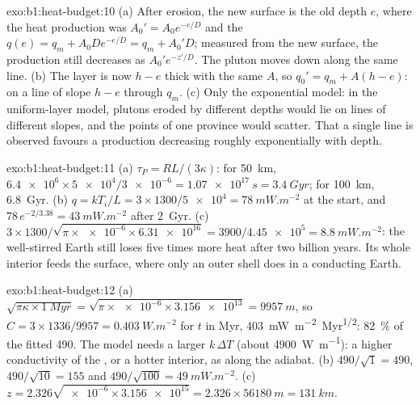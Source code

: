 \begin{solution}{exo:b1:heat-budget:10}
(a) After erosion, the new surface is the old depth $e$, where the heat
production was $A_0' = A_0e^{-e/D}$ and the  $q(e) = q_m +
A_0De^{-e/D} = q_m + A_0'D$; measured from the new surface, the production
still decreases as $A_0'e^{-z'/D}$. The pluton moves down along the same line.
(b) The layer is now $h - e$ thick with the same $A$, so $q_0' = q_m + A(h - e)$:
on a line of slope $h - e$ through $q_m$. (c) Only the exponential model: in the
uniform-layer model, plutons eroded by different depths would lie on lines of
different slopes, and the points of one province would scatter. That a single
line is observed favours a production decreasing roughly exponentially with
depth.
\end{solution}

\begin{solution}{exo:b1:heat-budget:11}
(a) $\tau_P = RL/(3\kappa)$: for \qty{50}{km}, $\num{6.4e6}\times\num{5e4}/\num{3e-6}
= \qty{1.07e17}{s} = \qty{3.4}{Gyr}$; for \qty{100}{km}, \qty{6.8}{Gyr}.
(b) $q = kT_i/L = 3\times1300/\num{5e4} = \qty{78}{mW.m^{-2}}$ at the start,
and $78\,e^{-2/3.38} = \qty{43}{mW.m^{-2}}$ after \qty{2}{Gyr}. (c)
$3\times1300/\sqrt{\pi\times\num{e-6}\times\num{6.31e16}} = 3900/\num{4.45e5} =
\qty{8.8}{mW.m^{-2}}$: the well-stirred Earth still loses five times more heat
after two billion years. Its whole interior feeds the surface, where only an
outer shell does in a conducting Earth.
\end{solution}

\begin{solution}{exo:b1:heat-budget:12}
(a) $\sqrt{\pi\kappa\times\qty{1}{Myr}} = \sqrt{\pi\times\num{e-6}\times\num{3.156e13}}
= \qty{9957}{m}$, so $C = 3\times1336/9957 = \qty{0.403}{W.m^{-2}}$ for
$t$ in Myr, \qty{403}{mW.m^{-2}.Myr^{1/2}}: \qty{82}{\percent} of the fitted
490. The model needs a larger $k\,\Delta T$ (about \qty{4900}{W.m^{-1}}): a
higher conductivity of the , or a hotter interior, as along the adiabat.
(b) $490/\sqrt1 = 490$, $490/\sqrt{10} = 155$ and $490/\sqrt{100} =
\qty{49}{mW.m^{-2}}$. (c) $z = 2.326\sqrt{\num{e-6}\times\num{3.156e15}} =
2.326\times\qty{56180}{m} = \qty{131}{km}$.
\end{solution}

